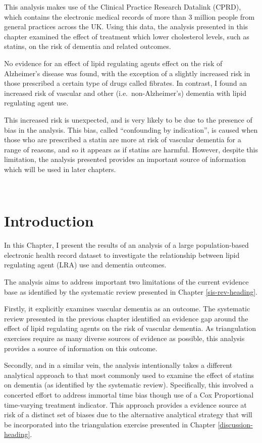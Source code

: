 \documentclass[a4paper, twoside]{templates/ociamthesis}
\begin{document}
This analysis makes use of the Clinical Practice Research Datalink (CPRD), which contains the electronic medical records of more than 3 million people from general practices across the UK. Using this data, the analysis presented in this chapter examined the effect of treatment which lower cholesterol levels, such as statins, on the risk of dementia and related outcomes.

No evidence for an effect of lipid regulating agents effect on the risk of Alzheimer's disease was found, with the exception of a slightly increased risk in those prescribed a certain type of drugs called fibrates. In contrast, I found an increased risk of vascular and other (i.e.~non-Alzheimer's) dementia with lipid regulating agent use.

This increased risk is unexpected, and is very likely to be due to the presence of bias in the analysis. This bias, called ``confounding by indication'', is caused when those who are prescribed a statin are more at risk of vascular dementia for a range of reasons, and so it appears as if statins are harmful. However, despite this limitation, the analysis presented provides an important source of information which will be used in later chapters.

~

\hypertarget{introduction-1}{%
\section{Introduction}\label{introduction-1}}

In this Chapter, I present the results of an analysis of a large population-based electronic health record dataset to investigate the relationship between lipid regulating agent (LRA) use and dementia outcomes.

The analysis aims to address important two limitations of the current evidence base as identified by the systematic review presented in Chapter \ref{sis-rev-heading}.

Firstly, it explicitly examines vascular dementia as an outcome. The systematic review presented in the previous chapter identified an evidence gap around the effect of lipid regulating agents on the risk of vascular dementia. As triangulation exercises require as many diverse sources of evidence as possible, this analysis provides a source of information on this outcome.

Secondly, and in a similar vein, the analysis intentionally takes a different analytical approach to that most commonly used to examine the effect of statins on dementia (as identified by the systematic review). Specifically, this involved a concerted effort to address immortal time bias though use of a Cox Proportional time-varying treatment indicator. This approach provides a evidence source at risk of a distinct set of biases due to the alternative analytical strategy that will be incorporated into the triangulation exercise presented in Chapter \ref{discussion-heading}.
\end{document}
